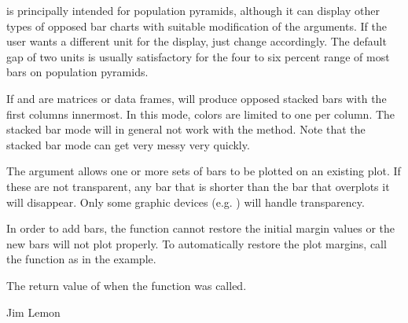 \begin{Details}\relax
{} is principally intended for population pyramids,
although it can display other types of opposed bar charts with suitable
modification of the arguments. If the user wants a different unit for
the display, just change  accordingly. The default gap of 
two units is usually satisfactory for the four to six percent range 
of most bars on population pyramids.

If  and  are matrices or data frames, 
 will produce opposed stacked bars with the first 
columns innermost. In this mode, colors are limited to one per column. The 
stacked bar mode will in general not work with the  method. Note 
that the stacked bar mode can get very messy very quickly.

The  argument allows one or more sets of bars to be plotted
on an existing plot. If these are not transparent, any bar that is
shorter than the bar that overplots it will disappear. Only some graphic
devices (e.g. ) will handle transparency.

In order to add bars, the function cannot restore the initial margin values
or the new bars will not plot properly. To automatically restore the plot
margins, call the function as in the example.
\end{Details}
\begin{Value}
The return value of  when the function was called.
\end{Value}
\begin{Author}\relax
Jim Lemon
\end{Author}
\begin{SeeAlso}\relax
{}
\end{SeeAlso}
